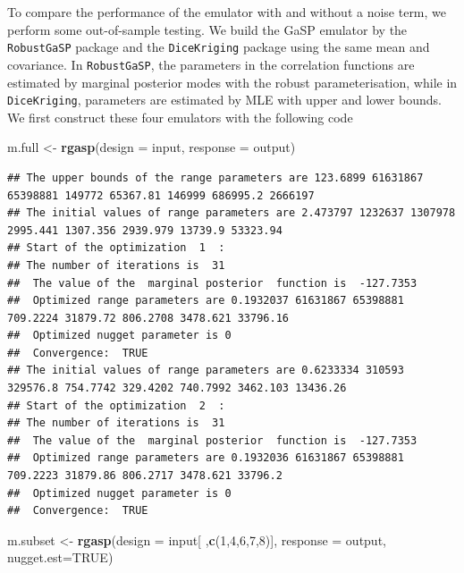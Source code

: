 \documentclass[
  10pt,
]{article}
\newenvironment{Shaded}{\begin{snugshade}}{\end{snugshade}}
\newcommand{\AttributeTok}[1]{\textcolor[rgb]{0.13,0.29,0.53}{#1}}
\newcommand{\ConstantTok}[1]{\textcolor[rgb]{0.56,0.35,0.01}{#1}}
\newcommand{\DecValTok}[1]{\textcolor[rgb]{0.00,0.00,0.81}{#1}}
\newcommand{\FunctionTok}[1]{\textcolor[rgb]{0.13,0.29,0.53}{\textbf{#1}}}
\newcommand{\NormalTok}[1]{#1}
\newcommand{\OtherTok}[1]{\textcolor[rgb]{0.56,0.35,0.01}{#1}}
\begin{document}
To compare the performance of the emulator with and without a noise
term, we perform some out-of-sample testing. We build the GaSP emulator
by the \texttt{RobustGaSP} package and the \texttt{DiceKriging} package
using the same mean and covariance. In \texttt{RobustGaSP}, the
parameters in the correlation functions are estimated by marginal
posterior modes with the robust parameterisation, while in
\texttt{DiceKriging}, parameters are estimated by MLE with upper and
lower bounds. We first construct these four emulators with the following
code

\begin{Shaded}
\begin{Highlighting}[]
\NormalTok{m.full }\OtherTok{\textless{}{-}} \FunctionTok{rgasp}\NormalTok{(}\AttributeTok{design =}\NormalTok{ input, }\AttributeTok{response =}\NormalTok{ output)}
\end{Highlighting}
\end{Shaded}

\begin{verbatim}
## The upper bounds of the range parameters are 123.6899 61631867 65398881 149772 65367.81 146999 686995.2 2666197 
## The initial values of range parameters are 2.473797 1232637 1307978 2995.441 1307.356 2939.979 13739.9 53323.94 
## Start of the optimization  1  : 
## The number of iterations is  31 
##  The value of the  marginal posterior  function is  -127.7353 
##  Optimized range parameters are 0.1932037 61631867 65398881 709.2224 31879.72 806.2708 3478.621 33796.16 
##  Optimized nugget parameter is 0 
##  Convergence:  TRUE 
## The initial values of range parameters are 0.6233334 310593 329576.8 754.7742 329.4202 740.7992 3462.103 13436.26 
## Start of the optimization  2  : 
## The number of iterations is  31 
##  The value of the  marginal posterior  function is  -127.7353 
##  Optimized range parameters are 0.1932036 61631867 65398881 709.2223 31879.86 806.2717 3478.621 33796.2 
##  Optimized nugget parameter is 0 
##  Convergence:  TRUE
\end{verbatim}

\begin{Shaded}
\begin{Highlighting}[]
\NormalTok{m.subset }\OtherTok{\textless{}{-}} \FunctionTok{rgasp}\NormalTok{(}\AttributeTok{design =}\NormalTok{ input[ ,}\FunctionTok{c}\NormalTok{(}\DecValTok{1}\NormalTok{,}\DecValTok{4}\NormalTok{,}\DecValTok{6}\NormalTok{,}\DecValTok{7}\NormalTok{,}\DecValTok{8}\NormalTok{)], }\AttributeTok{response =}\NormalTok{ output,}
                  \AttributeTok{nugget.est=}\ConstantTok{TRUE}\NormalTok{)}
\end{Highlighting}
\end{Shaded}
\end{document}
